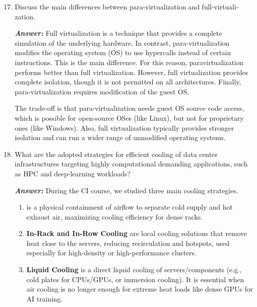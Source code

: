 \begin{enumerate}
    \setcounter{enumi}{16}

    \item Discuss the main differences between para-virtualization and full-virtuali-\break zation.
    
    \textcolor{Green3}{\textbf{\emph{Answer:}}} Full virtualization is a technique that provides a complete simulation of the underlying hardware. In contrast, para-virtualization modifies the operating system (OS) to use hypercalls instead of certain instructions. This is the main difference. For this reason, paravirtualization performs better than full virtualization. However, full virtualization provides complete isolation, though it is not permitted on all architectures. Finally, para-virtualization requires modification of the guest OS.

    The trade-off is that para-virtualization needs guest OS source code access, which is possible for open-source OSes (like Linux), but not for proprietary ones (like Windows). Also, full virtualization typically provides stronger isolation and can run a wider range of unmodified operating systems.

    \item What are the adopted strategies for efficient cooling of data center infrastructures targeting highly computational demanding applications, such as HPC and deep-learning workloads?
    
    \textcolor{Green3}{\textbf{\emph{Answer:}}} During the CI course, we studied three main cooling strategies.
    \begin{enumerate}
        \item {} is a physical containment of airflow to separate cold supply and hot exhaust air, maximizing cooling efficiency for dense racks.
        \item \textbf{In-Rack and In-Row Cooling} are local cooling solutions that remove heat close to the servers, reducing recirculation and hotspots, used especially for high-density or high-performance clusters.
        \item \textbf{Liquid Cooling} is a direct liquid cooling of servers/components (e.g., cold plates for CPUs/GPUs, or immersion cooling). It is essential when air cooling is no longer enough for extreme heat loads like dense GPUs for AI training.
    \end{enumerate}
\end{enumerate}